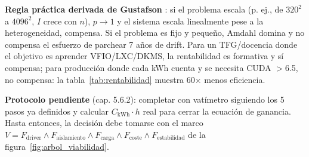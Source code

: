 \textbf{Regla práctica derivada de Gustafson} \cite{gustafson1988}: si el problema escala (p. ej., de $320^2$ a $4096^2$, $I$ crece con $n$), $p\to1$ y el sistema escala linealmente pese a la heterogeneidad, compensa. Si el problema es fijo y pequeño, Amdahl domina y no compensa el esfuerzo de parchear 7 años de drift. Para un TFG/docencia donde el objetivo es aprender VFIO/LXC/DKMS, la rentabilidad es formativa y sí compensa; para producción donde cada kWh cuenta y se necesita CUDA $>$6.5, no compensa: la tabla~\ref{tab:rentabilidad} muestra 60$\times$ menos eficiencia.

\textbf{Protocolo pendiente} (cap. 5.6.2): completar con vatímetro siguiendo los 5 pasos ya definidos y calcular $C_{\text{kWh}}\cdot h$ real para cerrar la ecuación de ganancia. Hasta entonces, la decisión debe tomarse con el marco $V = F_{\text{driver}}\land F_{\text{aislamiento}}\land F_{\text{carga}}\land F_{\text{coste}}\land F_{\text{estabilidad}}$ de la figura~\ref{fig:arbol_viabilidad}.

